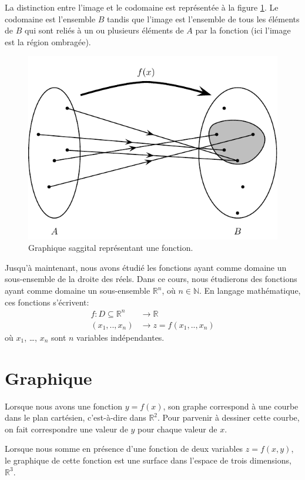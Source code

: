 \documentclass[]{book}
\theoremstyle{definition}
\theoremstyle{definition}
\theoremstyle{definition}
\theoremstyle{remark}
\begin{document}
La distinction entre l'image et le codomaine est représentée à la figure
\ref{fig:representationfonction}. Le codomaine est l'ensemble \(B\)
tandis que l'image est l'ensemble de tous les éléments de \(B\) qui sont
reliés à un ou plusieurs éléments de \(A\) par la fonction (ici l'image
est la région ombragée).

\begin{figure}

{\centering \includegraphics[width=0.5\linewidth]{resources/images/latex/representationfonction} 

}

\caption{Graphique saggital représentant une fonction.}\label{fig:representationfonction}
\end{figure}

Jusqu'à maintenant, nous avons étudié les fonctions ayant comme domaine
un sous-ensemble de la droite des réels. Dans ce cours, nous étudierons
des fonctions ayant comme domaine un sous-ensemble \(\mathbb{R}^n\), où
\(n\in\mathbb{N}\). En langage mathématique, ces fonctions s'écrivent:
\begin{align*}
f: D\subseteq \mathbb{R}^n &\longrightarrow \mathbb{R}\\
(x_1,..,x_n)&\longrightarrow z=f(x_1,..,x_n)
\end{align*} où \(x_1\), \ldots{}, \(x_n\) sont \(n\) variables
indépendantes.

\hypertarget{graphiques-divers}{%
\section{Graphique}\label{graphiques-divers}}

Lorsque nous avons une fonction \(y=f(x)\), son graphe correspond à une
courbe dans le plan cartésien, c'est-à-dire dans \(\mathbb{R}^2\). Pour
parvenir à dessiner cette courbe, on fait correspondre une valeur de
\(y\) pour chaque valeur de \(x\).

Lorsque nous somme en présence d'une fonction de deux variables
\(z=f(x,y)\), le graphique de cette fonction est une surface dans
l'espace de trois dimensions, \(\mathbb{R}^3\).
\end{document}
